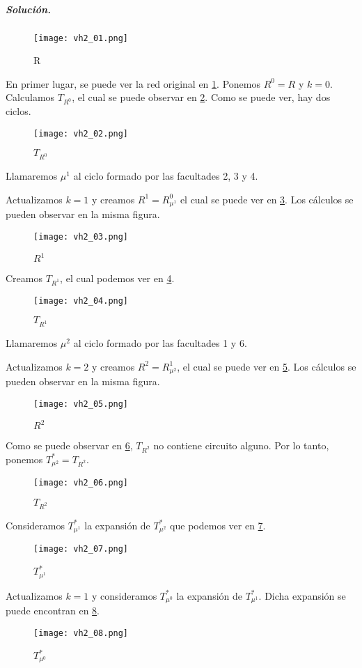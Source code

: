 \documentclass[12pt, oneside, a4paper]{article}
\begin{document}
\subparagraph{Solución.\\}

\begin{figure}
\centering
\texttt{[image: vh2\_01.png]}
\caption{\small R}
\label{fig:vh2-01}
\end{figure}
En primer lugar, se puede ver la red original en \ref{fig:vh2-01}.
Ponemos $R^0=R$ y $k=0$. Calculamos $T_{R^0}$, el cual se puede
observar en \ref{fig:vh2-02}. Como se puede ver, hay dos
ciclos.

\begin{figure}
\centering
\texttt{[image: vh2\_02.png]}
\caption{$T_{R^{0}}$}
\label{fig:vh2-02}
\end{figure}

Llamaremos $\mu^1$ al ciclo formado por las facultades 2, 3 y
4.

Actualizamos $k=1$ y creamos $R^1=R^0_{\mu^1}$ el cual se puede ver
en \ref{fig:vh2-03}. Los cálculos se pueden observar en la misma
figura.

\begin{figure}
\centering
\texttt{[image: vh2\_03.png]}
\caption{$R^{1}$}
\label{fig:vh2-03}
\end{figure}

Creamos $T_{R^{1}}$, el cual podemos ver en \ref{fig:vh2-04}.

\begin{figure}
\centering
\texttt{[image: vh2\_04.png]}
\caption{$T_{R^{1}}$}
\label{fig:vh2-04}
\end{figure}

Llamaremos $\mu^2$ al ciclo formado por las facultades 1 y 6.

Actualizamos $k=2$ y creamos $R^2=R^1_{\mu^2}$, el cual se puede ver
en \ref{fig:vh2-05}. Los cálculos se pueden observar en la misma figura.

\begin{figure}
\centering
\texttt{[image: vh2\_05.png]}
\caption{$R^2$}
\label{fig:vh2-05}
\end{figure}

Como se puede observar en \ref{fig:vh2-06}, $T_{R^{2}}$ no contiene
circuito alguno. Por lo tanto, ponemos $T^{*}_{\mu^{2}}=T_{R^{2}}$.

\begin{figure}
\centering
\texttt{[image: vh2\_06.png]}
\caption{$T_{R^2}$}
\label{fig:vh2-06}
\end{figure}

Consideramos $T^{*}_{\mu^{1}}$ la expansión de $T^{*}_{\mu^{2}}$ que
podemos ver en \ref{fig:vh2-07}.

\begin{figure}
\centering
\texttt{[image: vh2\_07.png]}
\caption{$T^{*}_{\mu^1}$}
\label{fig:vh2-07}
\end{figure}

Actualizamos $k=1$ y consideramos $T^{*}_{\mu^{0}}$ la expansión de
$T^{*}_{\mu^{1}}$. Dicha expansión se puede encontran en
\ref{fig:vh2-08}.

\begin{figure}
\centering
\texttt{[image: vh2\_08.png]}
\caption{$T^{*}_{\mu^0}$}
\label{fig:vh2-08}
\end{figure}
\end{document}
